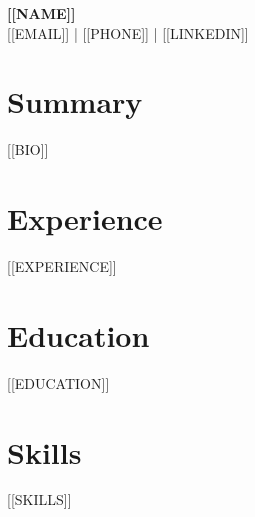\documentclass[11pt,a4paper]{article}
\begin{document}
\begin{center}
    {\Huge \bfseries \color{accent} [[NAME]]} \\
    \medskip
    \color{gray} [[EMAIL]] | [[PHONE]] | [[LINKEDIN]]
\end{center}

\vspace{1em}

\section*{\color{accent} Summary}
[[BIO]]

\section*{\color{accent} Experience}
[[EXPERIENCE]]

\section*{\color{accent} Education}
[[EDUCATION]]

\section*{\color{accent} Skills}
[[SKILLS]]
\end{document}
